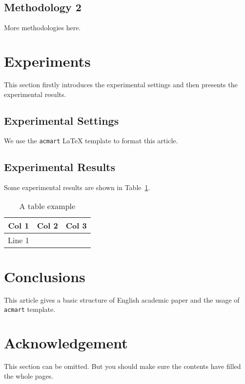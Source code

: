 \documentclass[sigconf]{acmart}
\begin{document}
\subsection{Methodology 2}
More methodologies here.

\section{Experiments}
This section firstly introduces the experimental settings and then presents the experimental results.

\subsection{Experimental Settings}
We use the \verb'acmart' \LaTeX{} template to format this article.

\subsection{Experimental Results}
Some experimental results are shown in Table~\ref{tab:ex}.
\begin{table}[htbp]
\caption{A table example}
\label{tab:ex}
\begin{tabular}{|c|c|c|}\hline
Col 1 & Col 2 & Col 3\\\hline
Line 1 & & \\\hline
\end{tabular}
\end{table}

\section{Conclusions}
This article gives a basic structure of English academic paper and the usage of \verb'acmart' template.

\section*{Acknowledgement}
This section can be omitted. But you should make sure the contents have filled the whole pages.



\end{document}
